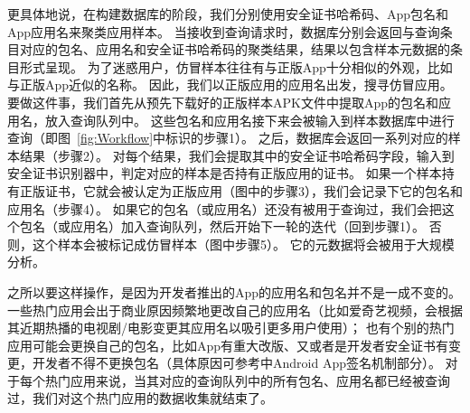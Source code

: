 更具体地说，在构建数据库的阶段，我们分别使用安全证书哈希码、App包名和App应用名来聚类应用样本。
当接收到查询请求时，数据库分别会返回与查询条目对应的包名、应用名和安全证书哈希码的聚类结果，结果以包含样本元数据的条目形式呈现。
为了迷惑用户，仿冒样本往往有与正版App十分相似的外观，比如与正版App近似的名称。
因此，我们以正版应用的应用名出发，搜寻仿冒应用。
要做这件事，我们首先从预先下载好的正版样本APK文件中提取App的包名和应用名，放入查询队列中。
这些包名和应用名接下来会被输入到样本数据库中进行查询（即图~\ref{fig:Workflow}中标识的步骤1）。
之后，数据库会返回一系列对应的样本结果（步骤2）。
对每个结果，我们会提取其中的安全证书哈希码字段，输入到安全证书识别器中，判定对应的样本是否持有正版应用的证书。
如果一个样本持有正版证书，它就会被认定为正版应用（图中的步骤3），我们会记录下它的包名和应用名（步骤4）。
如果它的包名（或应用名）还没有被用于查询过，我们会把这个包名（或应用名）加入查询队列，然后开始下一轮的迭代（回到步骤1）。
否则，这个样本会被标记成仿冒样本（图中步骤5）。
它的元数据将会被用于大规模分析。

之所以要这样操作，是因为开发者推出的App的应用名和包名并不是一成不变的。
一些热门应用会出于商业原因频繁地更改自己的应用名（比如爱奇艺视频，会根据其近期热播的电视剧/电影变更其应用名以吸引更多用户使用）；
也有个别的热门应用可能会更换自己的包名，比如App有重大改版、又或者是开发者安全证书有变更，开发者不得不更换包名（具体原因可参考中Android App签名机制部分）。
对于每个热门应用来说，当其对应的查询队列中的所有包名、应用名都已经被查询过，我们对这个热门应用的数据收集就结束了。

